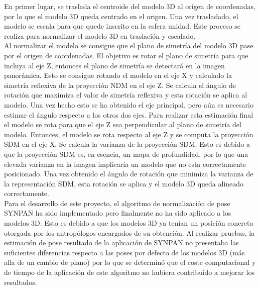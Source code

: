 En primer lugar, se traslada el centroide del modelo 3D al origen de coordenadas, por lo que el modelo 3D queda centrado en el origen. Una vez trasladado, el modelo se escala para que quede inscrito en la esfera unidad. Este proceso se realiza para normalizar el modelo 3D en traslación y escalado.\\

Al normalizar el modelo se consigue que el plano de simetría del modelo 3D pase por el origen de coordenadas. El objetivo es rotar el plano de simetría para que incluya al eje Z, entonces el plano de simetría se detectará en la imagen panorámica. Esto se consigue rotando el modelo en el eje X y calculado la simetría reflexiva de la proyección NDM en el eje Z. Se calcula el ángulo de rotación que maximiza el valor de simetría reflexiva y esta rotación se aplica al modelo. Una vez hecho esto se ha obtenido el eje principal, pero aún es necesario estimar el ángulo respecto a los otros dos ejes. Para realizar esta estimación final el modelo se rota para que el eje Z sea perpendicular al plano de simetría del modelo. Entonces, el modelo se rota respecto al eje Z y se computa la proyección SDM en el eje X. Se calcula la varianza de la proyección SDM. Esto es debido a que la proyección SDM es, en esencia, un mapa de profundidad, por lo que una elevada varianza en la imagen implicaría un modelo que no esta correctamente posicionado. Una vez obtenido el ángulo de rotación que minimiza la varianza de la representación SDM, esta rotación se aplica y el modelo 3D queda alineado correctamente.\\

Para el desarrollo de este proyecto, el algoritmo de normalización de pose SYNPAN ha sido implementado pero finalmente no ha sido aplicado a los modelos 3D. Esto es debido a que los modelos 3D ya tenían un posición concreta otorgada por los antropólogos encargados de su obtención. Al realizar pruebas, la estimación de pose resultado de la aplicación de SYNPAN no presentaba las suficientes diferencias respecto a las poses por defecto de los modelos 3D (más alla de un cambio de plano) por lo que se determinó que el coste computacional y de tiempo de la aplicación de este algoritmo no hubiera contribuido a mejorar los resultados.
